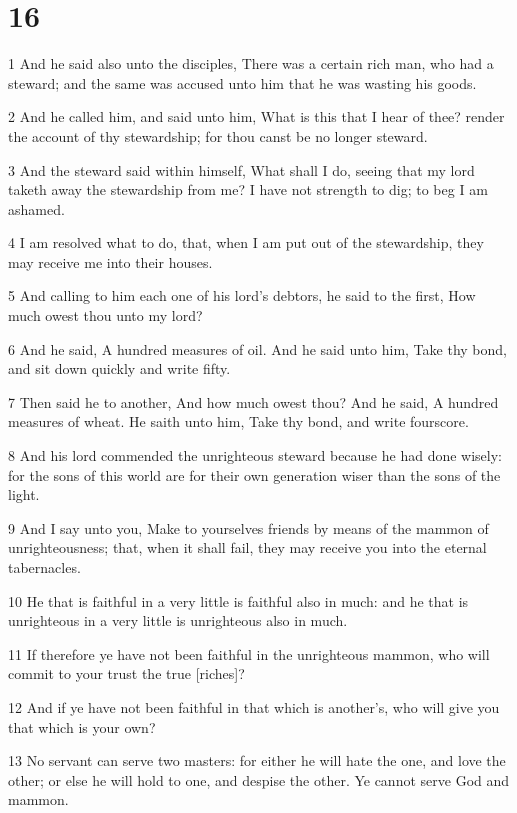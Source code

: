 \chapter{16}

\par 1 And he said also unto the disciples, There was a certain rich man, who had a steward; and the same was accused unto him that he was wasting his goods.
\par 2 And he called him, and said unto him, What is this that I hear of thee? render the account of thy stewardship; for thou canst be no longer steward.
\par 3 And the steward said within himself, What shall I do, seeing that my lord taketh away the stewardship from me? I have not strength to dig; to beg I am ashamed.
\par 4 I am resolved what to do, that, when I am put out of the stewardship, they may receive me into their houses.
\par 5 And calling to him each one of his lord's debtors, he said to the first, How much owest thou unto my lord?
\par 6 And he said, A hundred measures of oil. And he said unto him, Take thy bond, and sit down quickly and write fifty.
\par 7 Then said he to another, And how much owest thou? And he said, A hundred measures of wheat. He saith unto him, Take thy bond, and write fourscore.
\par 8 And his lord commended the unrighteous steward because he had done wisely: for the sons of this world are for their own generation wiser than the sons of the light.
\par 9 And I say unto you, Make to yourselves friends by means of the mammon of unrighteousness; that, when it shall fail, they may receive you into the eternal tabernacles.
\par 10 He that is faithful in a very little is faithful also in much: and he that is unrighteous in a very little is unrighteous also in much.
\par 11 If therefore ye have not been faithful in the unrighteous mammon, who will commit to your trust the true [riches]?
\par 12 And if ye have not been faithful in that which is another's, who will give you that which is your own?
\par 13 No servant can serve two masters: for either he will hate the one, and love the other; or else he will hold to one, and despise the other. Ye cannot serve God and mammon.
